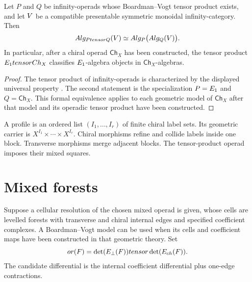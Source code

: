 \begin{theorem}
Let $P$ and $Q$ be infinity-operads whose Boardman--Vogt tensor product exists, and let $V$ be a compatible presentable symmetric monoidal infinity-category.  Then
\[
 Alg_{Ptensor Q}(V)
 \simeq
 Alg_P\bigl(Alg_Q(V)\bigr).
\]
In particular, after a chiral operad $\mathsf{Ch}_X$ has been constructed, the tensor product $E_1tensorCh_X$ classifies $E_1$-algebra objects in $\mathsf{Ch}_X$-algebras.
\end{theorem}
\begin{proof}
The tensor product of infinity-operads is characterized by the displayed universal property \cite{LurieHA}.  The second statement is the specialization $P=E_1$ and $Q=\mathsf{Ch}_X$.  This formal equivalence applies to each geometric model of $\mathsf{Ch}_X$ after that model and its operadic tensor product have been constructed.
\end{proof}

A profile is an ordered list $(I_1,\ldots,I_r)$ of finite chiral label sets. Its geometric carrier is $X^{I_1}\times\cdots\times X^{I_r}$. Chiral morphisms refine and collide labels inside one block. Transverse morphisms merge adjacent blocks. The tensor-product operad imposes their mixed squares.

\section{Mixed forests}
Suppose a cellular resolution of the chosen mixed operad is given, whose cells
are levelled forests with transverse and chiral internal edges and specified
coefficient complexes. A Boardman--Vogt model can be used when its cells and
coefficient maps have been constructed in that geometric theory. Set
\[
 or(F)=\det(E_\perp(F))tensor\det(E_{ch}(F)).
\]
The candidate differential is the internal coefficient differential plus one-edge contractions.

